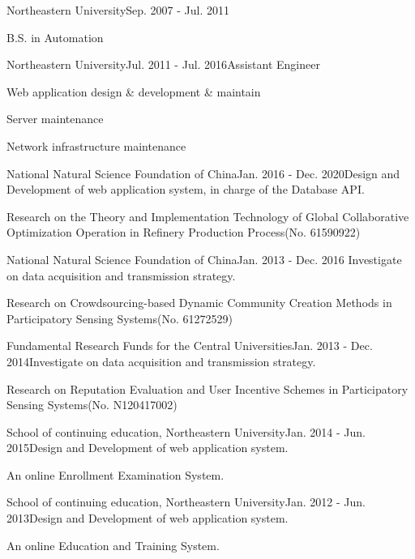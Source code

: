 \documentclass{joel_cv}
\begin{document}
\begin{sectionContentSimple}{Northeastern University}{Sep. 2007 - Jul. 2011}
	\item B.S. in Automation
\end{sectionContentSimple}


%
%


\begin{sectionContentNormal}{Northeastern University}{Jul. 2011 - Jul. 2016}{Assistant Engineer}
	\item Web application design \& development \& maintain
	\item Server maintenance
	\item Network infrastructure maintenance
\end{sectionContentNormal}



%
%



\begin{sectionContentNormal}{National Natural Science Foundation of China}{Jan. 2016 - Dec. 2020}{Design and Development of web application system, in charge of the Database API.}
	\item Research on the Theory and Implementation Technology of Global Collaborative Optimization Operation in Refinery Production Process(No. 61590922)
\end{sectionContentNormal}

\begin{sectionContentNormal}{National Natural Science Foundation of China}{Jan. 2013 - Dec. 2016}{ Investigate on data acquisition and transmission strategy.}
	\item Research on Crowdsourcing-based Dynamic Community Creation Methods in Participatory Sensing Systems(No. 61272529)
\end{sectionContentNormal}

\begin{sectionContentNormal}{Fundamental Research Funds for the Central Universities}{Jan. 2013 - Dec. 2014}{Investigate on data acquisition and transmission strategy.}
	\item Research on Reputation Evaluation and User Incentive Schemes in Participatory Sensing Systems(No. N120417002)
\end{sectionContentNormal}

\begin{sectionContentNormal}{School of continuing education, Northeastern University}{Jan. 2014 - Jun. 2015}{Design and Development of web application system.}
	\item An online Enrollment Examination System.
\end{sectionContentNormal}

\begin{sectionContentNormal}{School of continuing education, Northeastern University}{Jan. 2012 - Jun. 2013}{Design and Development of web application system.}
	\item An online Education and Training System.
\end{sectionContentNormal}
\end{document}
